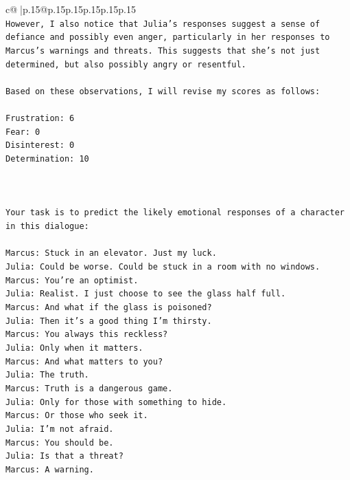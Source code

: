 \documentclass{article}
\begin{document}
{\begin{supertabular}{c@{$\;$}|p{.15\linewidth}@{}p{.15\linewidth}p{.15\linewidth}p{.15\linewidth}p{.15\linewidth}p{.15\linewidth}}
{{{\\ 
\texttt{However, I also notice that Julia's responses suggest a sense of defiance and possibly even anger, particularly in her responses to Marcus's warnings and threats. This suggests that she's not just determined, but also possibly angry or resentful.} \\
\\ 
\texttt{Based on these observations, I will revise my scores as follows:} \\
\\ 
\texttt{Frustration: 6} \\
\texttt{Fear: 0} \\
\texttt{Disinterest: 0} \\
\texttt{Determination: 10} \\
\\ 
\\ 
\\ 
\texttt{Your task is to predict the likely emotional responses of a character in this dialogue:} \\
\\ 
\texttt{Marcus: Stuck in an elevator. Just my luck.} \\
\texttt{Julia: Could be worse. Could be stuck in a room with no windows.} \\
\texttt{Marcus: You're an optimist.} \\
\texttt{Julia: Realist. I just choose to see the glass half full.} \\
\texttt{Marcus: And what if the glass is poisoned?} \\
\texttt{Julia: Then it's a good thing I'm thirsty.} \\
\texttt{Marcus: You always this reckless?} \\
\texttt{Julia: Only when it matters.} \\
\texttt{Marcus: And what matters to you?} \\
\texttt{Julia: The truth.} \\
\texttt{Marcus: Truth is a dangerous game.} \\
\texttt{Julia: Only for those with something to hide.} \\
\texttt{Marcus: Or those who seek it.} \\
\texttt{Julia: I'm not afraid.} \\
\texttt{Marcus: You should be.} \\
\texttt{Julia: Is that a threat?} \\
\texttt{Marcus: A warning.} \\
}}}
\end{supertabular}}
\end{document}
